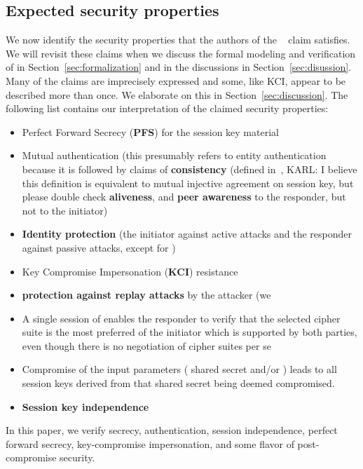 \subsection{Expected security properties}
\label{sec:claimedProperties}
We now identify the security properties that the authors
of the \mSpec{}~\cite{selander-lake-edhoc-01} claim \mEdhoc{} satisfies.
%
We will revisit these claims when we discuss the formal modeling and
verification of \mEdhoc{} in Section~\ref{sec:formalization} and in the
discussions in Section~\ref{sec:disussion}.
%
Many of the claims are imprecisely expressed and some, like KCI, appear to be
described more than once.
%
We elaborate on this in Section~\ref{sec:discussion}.
%
The following list contains our interpretation of the claimed security
properties:
\begin{itemize}
    \item Perfect Forward Secrecy (\textbf{PFS}) for the session key material
    \item Mutual authentication (this presumably refers to entity authentication
        because it is followed by claims of
        \textbf{consistency} (defined in~\cite{sigma}, {\color{red} KARL: I
            believe this definition is equivalent to mutual injective agreement
            on session key, but please double check}
        \textbf{aliveness}, and
        \textbf{peer awareness} to the responder, but not to the initiator)
    \item \textbf{Identity protection} (the initiator against active attacks
        and the responder against passive attacks, except for \mPskPsk{})
    \item Key Compromise Impersonation (\textbf{KCI}) resistance
    \item \textbf{protection against replay attacks} by the attacker (we
    \item A single session of \mEdhoc{} enables the responder to verify
            that the selected cipher suite is the most preferred of the
            initiator which is supported by both parties, even though there is
            no negotiation of cipher suites per se
    \item Compromise of the \mHkdf{} input parameters (\mGxy{} shared
            secret and/or \mPsk) leads to all session keys derived from that
            shared secret being deemed compromised.
        \item \textbf{Session key independence}
\end{itemize}
%
In this paper, we verify {\color{red} secrecy, authentication, session independence,
perfect forward secrecy, key-compromise impersonation, and some
flavor of post-compromise security.}
%
